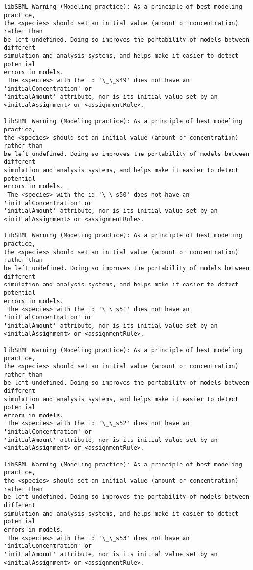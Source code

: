 \documentclass[11pt]{article}
\begin{document}
\begin{Verbatim}[commandchars=\\\{\}]
libSBML Warning (Modeling practice): As a principle of best modeling practice,
the <species> should set an initial value (amount or concentration) rather than
be left undefined. Doing so improves the portability of models between different
simulation and analysis systems, and helps make it easier to detect potential
errors in models.
 The <species> with the id '\_\_s49' does not have an 'initialConcentration' or
'initialAmount' attribute, nor is its initial value set by an
<initialAssignment> or <assignmentRule>.

libSBML Warning (Modeling practice): As a principle of best modeling practice,
the <species> should set an initial value (amount or concentration) rather than
be left undefined. Doing so improves the portability of models between different
simulation and analysis systems, and helps make it easier to detect potential
errors in models.
 The <species> with the id '\_\_s50' does not have an 'initialConcentration' or
'initialAmount' attribute, nor is its initial value set by an
<initialAssignment> or <assignmentRule>.

libSBML Warning (Modeling practice): As a principle of best modeling practice,
the <species> should set an initial value (amount or concentration) rather than
be left undefined. Doing so improves the portability of models between different
simulation and analysis systems, and helps make it easier to detect potential
errors in models.
 The <species> with the id '\_\_s51' does not have an 'initialConcentration' or
'initialAmount' attribute, nor is its initial value set by an
<initialAssignment> or <assignmentRule>.

libSBML Warning (Modeling practice): As a principle of best modeling practice,
the <species> should set an initial value (amount or concentration) rather than
be left undefined. Doing so improves the portability of models between different
simulation and analysis systems, and helps make it easier to detect potential
errors in models.
 The <species> with the id '\_\_s52' does not have an 'initialConcentration' or
'initialAmount' attribute, nor is its initial value set by an
<initialAssignment> or <assignmentRule>.

libSBML Warning (Modeling practice): As a principle of best modeling practice,
the <species> should set an initial value (amount or concentration) rather than
be left undefined. Doing so improves the portability of models between different
simulation and analysis systems, and helps make it easier to detect potential
errors in models.
 The <species> with the id '\_\_s53' does not have an 'initialConcentration' or
'initialAmount' attribute, nor is its initial value set by an
<initialAssignment> or <assignmentRule>.


\end{Verbatim}
\end{document}
